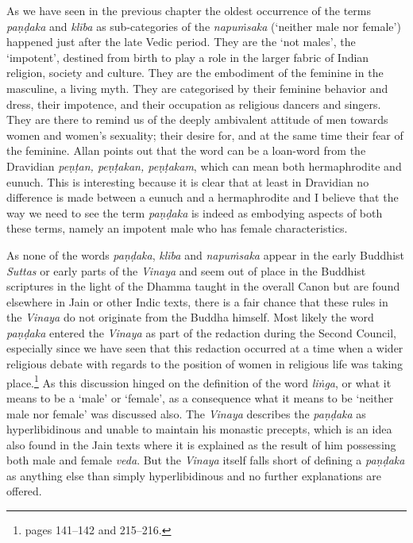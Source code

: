 As we have seen in the previous chapter the oldest occurrence of the terms {\em paṇḍaka} and {\em klība} as sub-categories of the {\em napuṁsaka} (`neither male nor female') happened just after the late Vedic period. They are the `not males', the `impotent', destined from birth to play a role in the larger fabric of Indian religion, society and culture. They are the embodiment of the feminine in the masculine, a living myth. They are categorised by their feminine behavior and dress, their impotence, and their occupation as religious dancers and singers. They are there to remind us of the deeply ambivalent attitude of men towards women and women's sexuality; their desire for, and at the same time their fear of the feminine. Allan \cite{bomhard} points out that the word can be a loan-word from the Dravidian {\em peṇṭan, peṇṭakan, peṇṭakam}, which can mean both hermaphrodite and eunuch. This is interesting because it is clear that at least in Dravidian no difference is made between a eunuch and a hermaphrodite and I believe that the way we need to see the term {\em paṇḍaka} is indeed as embodying aspects of both these terms, namely an impotent male who has female characteristics.

As none of the words {\em paṇḍaka}, {\em klība} and {\em napuṁsaka} appear in the early Buddhist {\em Suttas} or early parts of the {\em Vinaya} and seem out of place in the Buddhist scriptures in the light of the Dhamma taught in the overall Canon but are found elsewhere in Jain or other Indic texts, there is a fair chance that these rules in the {\em Vinaya} do not originate from the Buddha himself. Most likely the word {\em paṇḍaka} entered the {\em Vinaya} as part of the redaction during the Second Council, especially since we have seen that this redaction occurred at a time when a wider religious debate with regards to the position of women in religious life was taking place.\footnote{\cite{sujato2009} pages 141–142 and 215–216.} As this discussion hinged on the definition of the word {\em liṅga}, or what it means to be a `male' or `female', as a consequence what it means to be `neither male nor female' was discussed also. The {\em Vinaya} describes the {\em paṇḍaka} as hyperlibidinous and unable to maintain his monastic precepts, which is an idea also found in the Jain texts where it is explained as the result of him possessing both male and female {\em veda}. But the {\em Vinaya} itself falls short of defining a {\em paṇḍaka} as anything else than simply hyperlibidinous and no further explanations are offered. 

